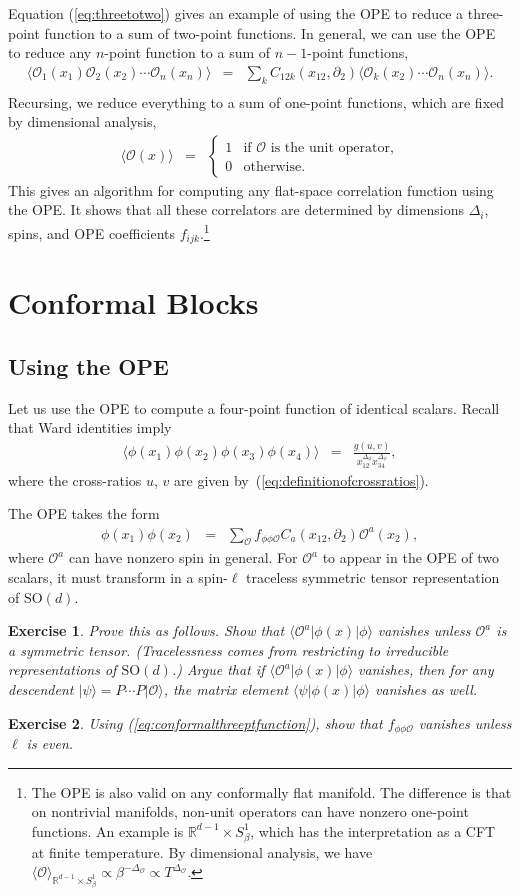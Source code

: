 \documentclass{ws-rv9x6}
\newcommand\be{\begin{eqnarray}}
\newcommand\ee{\end{eqnarray}}
\newcommand\f\phi
\newcommand\cO{\mathcal{O}}
\newcommand\ptl\partial
\newcommand\<\langle
\renewcommand\>\rangle
\newcommand\R{\mathbb{R}}
\newcommand\nn{\nonumber}
\renewcommand\.{\cdot}
\newcommand\x\times
\newcommand\SO{\mathrm{SO}}
\newcommand\De{\Delta}
\renewcommand\b\beta
\newtheorem{exercise}{Exercise}[section]
\begin{document}
Equation (\ref{eq:threetotwo}) gives an example of using the OPE to reduce a three-point function to a sum of two-point functions.  In general, we can use the OPE to reduce any $n$-point function to a sum of $n-1$-point functions,
\be
\<\cO_1(x_1)\cO_2(x_2)\cdots\cO_n(x_n)\> &=& \sum_k C_{12k}(x_{12},\ptl_2)\<\cO_k(x_2)\cdots\cO_n(x_n)\>.\nn\\
\ee
Recursing, we reduce everything to a sum of one-point functions, which are fixed by dimensional analysis,
\be
\<\cO(x)\> &=& \begin{cases}
1 & \textrm{if $\cO$ is the unit operator,}\\
0 & \textrm{otherwise.}
\end{cases}
\ee
This gives an algorithm for computing any flat-space correlation function using the OPE\@.  It shows that all these correlators are determined by dimensions $\De_i$, spins, and OPE coefficients $f_{ijk}$.\footnote{The OPE is also valid on any conformally flat manifold.  The difference is that on nontrivial manifolds, non-unit operators can have nonzero one-point functions.  An example is $\R^{d-1}\x S^1_\b$, which has the interpretation as a CFT at finite temperature.  By dimensional analysis, we have $\<\cO\>_{\R^{d-1}\x S^1_\b}\propto \b^{-\De_\cO}\propto T^{\De_\cO}$.\label{foot:finitetemperature}}

\section{Conformal Blocks}

\subsection{Using the OPE}

Let us use the OPE to compute a four-point function of identical scalars.  Recall that Ward identities imply
\be
\<\f(x_1)\f(x_2)\f(x_3)\f(x_4)\> &=& \frac{g(u,v)}{x_{12}^{\De_\f}x_{34}^{\De_\f}},
\ee
where the cross-ratios $u$, $v$ are given by~(\ref{eq:definitionofcrossratios}).

The OPE takes the form
\be
\label{eq:scalarscalarOPE}
\f(x_1)\f(x_2) &=& \sum_\cO f_{\f\f\cO} C_{a}(x_{12},\ptl_2)\cO^{a}(x_2),
\ee
where $\cO^{a}$ can have nonzero spin in general.  For $\cO^a$ to appear in the OPE of two scalars, it must transform in a spin-$\ell$ traceless symmetric tensor representation of $\SO(d)$.
\begin{exercise}
Prove this as follows. Show that $\<\cO^a|\f(x)|\f\>$ vanishes unless $\cO^a$ is a symmetric tensor.  (Tracelessness comes from restricting to irreducible representations of $\SO(d)$.) Argue that if $\<\cO^a|\f(x)|\f\>$ vanishes, then for any descendent $|\psi\>=P\cdots P|\cO\>$, the matrix element $\<\psi|\f(x)|\f\>$ vanishes as well.
\end{exercise}
\begin{exercise}
\label{exercise:elleven}
Using (\ref{eq:conformalthreeptfunction}), show that $f_{\f\f\cO}$ vanishes unless $\ell$ is even.
\end{exercise}
\end{document}
